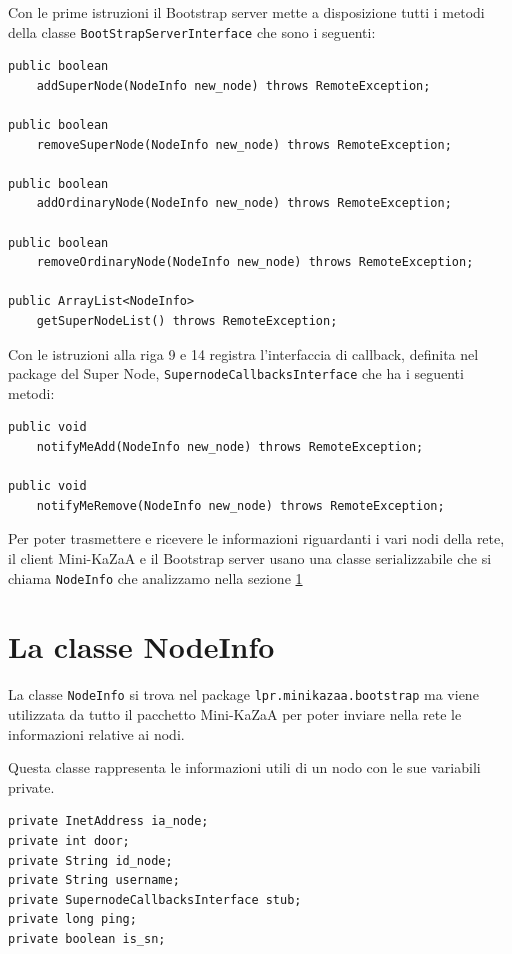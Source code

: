 Con le prime istruzioni il Bootstrap server mette a disposizione tutti i metodi della classe \verb|BootStrapServerInterface| che sono i seguenti:
\newline
\begin{lstlisting}
public boolean 
	addSuperNode(NodeInfo new_node) throws RemoteException;

public boolean 
	removeSuperNode(NodeInfo new_node) throws RemoteException;

public boolean 
	addOrdinaryNode(NodeInfo new_node) throws RemoteException;

public boolean 
	removeOrdinaryNode(NodeInfo new_node) throws RemoteException;

public ArrayList<NodeInfo> 
	getSuperNodeList() throws RemoteException;
\end{lstlisting}

Con le istruzioni alla riga 9 e 14 registra l'interfaccia di callback, definita nel package del Super Node,  \verb|SupernodeCallbacksInterface| che ha i seguenti metodi:
\newline
\begin{lstlisting}
public void 
	notifyMeAdd(NodeInfo new_node) throws RemoteException;

public void 
	notifyMeRemove(NodeInfo new_node) throws RemoteException;
\end{lstlisting}

Per poter trasmettere e ricevere le informazioni riguardanti i vari nodi della rete, il client Mini-KaZaA e il Bootstrap server usano una classe serializzabile che si chiama \verb|NodeInfo| che analizzamo nella sezione \ref{sec:nodeinfo}

\section{La classe NodeInfo}\label{sec:nodeinfo}
La classe \verb|NodeInfo| si trova nel package \verb|lpr.minikazaa.bootstrap| ma viene utilizzata da tutto il pacchetto Mini-KaZaA per poter inviare nella rete le informazioni relative ai nodi.

Questa classe rappresenta le informazioni utili di un nodo con le sue variabili private.

\begin{lstlisting}
private InetAddress ia_node;
private int door;
private String id_node;
private String username;
private SupernodeCallbacksInterface stub;
private long ping;
private boolean is_sn;
\end{lstlisting} 

